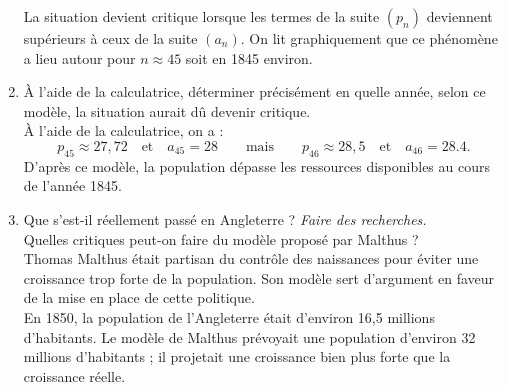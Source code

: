 \documentclass[a4paper,11pt,exos]{nsi} %
\begin{document}
\begin{enumerate}
\begin{center}
\begin{tikzpicture}[scale=.13]

        \end{tikzpicture}
    \end{center}
    La situation devient critique lorsque les termes de la suite $(p_n)$ deviennent supérieurs à ceux de la suite $(a_n)$. On lit graphiquement que ce phénomène a lieu autour pour $n\approx 45$ soit en 1845 environ.

    \item \textcolor{UGLiBlue}{À l'aide de la calculatrice, déterminer précisément en quelle année, selon ce modèle, la situation aurait dû devenir critique.}\\[.5em]
    À l'aide de la calculatrice, on a  :
    $$p_{45}\approx 27,72\quad \text{et} \quad a_{45}=28\qquad \text{mais}\qquad p_{46}\approx28,5\quad \text{et}\quad a_{46}=28.4.$$
    D'après ce modèle, la population dépasse les ressources disponibles au cours de l'année 1845.

    \item \textcolor{UGLiBlue}{Que s'est-il réellement passé en Angleterre ? \textit{Faire des recherches.}\\
    Quelles critiques peut-on faire du modèle proposé par Malthus ?}\\[.5em]
    Thomas Malthus était partisan du contrôle des naissances pour éviter une croissance trop forte de la population. Son modèle sert d'argument en faveur de la mise en place de cette politique.\\
    En 1850, la population de l'Angleterre était d'environ 16,5 millions d'habitants. Le modèle de Malthus prévoyait une population d'environ 32 millions d'habitants ; il projetait une croissance bien plus forte que la croissance réelle.


\end{enumerate}
\end{document}
